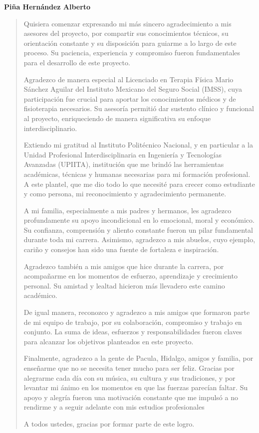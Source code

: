 \noindent \textbf{Piña Hernández Alberto}
\begin{quote}
    Quisiera comenzar expresando mi más sincero agradecimiento a mis asesores del proyecto, por compartir sus conocimientos técnicos, su orientación constante y su disposición para guiarme a lo largo de este proceso. Su paciencia, experiencia y compromiso fueron fundamentales para el desarrollo de este proyecto.
    
    Agradezco de manera especial al Licenciado en Terapia Física Mario Sánchez Aguilar del Instituto Mexicano del Seguro Social (IMSS), cuya participación fue crucial para aportar los conocimientos médicos y de fisioterapia necesarios. Su asesoría permitió dar sustento clínico y funcional al proyecto, enriqueciendo de manera significativa su enfoque interdisciplinario.
    
    Extiendo mi gratitud al Instituto Politécnico Nacional, y en particular a la Unidad Profesional Interdisciplinaria en Ingeniería y Tecnologías Avanzadas (UPIITA), institución que me brindó las herramientas académicas, técnicas y humanas necesarias para mi formación profesional. A este plantel, que me dio todo lo que necesité para crecer como estudiante y como persona, mi reconocimiento y agradecimiento permanente.
    
    A mi familia, especialmente a mis padres y hermanos, les agradezco profundamente su apoyo incondicional en lo emocional, moral y económico. Su confianza, comprensión y aliento constante fueron un pilar fundamental durante toda mi carrera. Asimismo, agradezco a mis abuelos, cuyo ejemplo, cariño y consejos han sido una fuente de fortaleza e inspiración.
    
    Agradezco también a mis amigos que hice durante la carrera, por acompañarme en los momentos de esfuerzo, aprendizaje y crecimiento personal. Su amistad y lealtad hicieron más llevadero este camino académico.
    
    De igual manera, reconozco y agradezco a mis amigos que formaron parte de mi equipo de trabajo, por su colaboración, compromiso y trabajo en conjunto. La suma de ideas, esfuerzos y responsabilidades fueron claves para alcanzar los objetivos planteados en este proyecto.
    
    Finalmente, agradezco a la gente de Pacula, Hidalgo, amigos y familia, por enseñarme que no se necesita tener mucho para ser feliz. Gracias por alegrarme cada día con su música, su cultura y sus tradiciones, y por levantar mi ánimo en los momentos en que las fuerzas parecían faltar. Su apoyo y alegría fueron una motivación constante que me impulsó a no rendirme y a seguir adelante con mis estudios profesionales
    
    A todos ustedes, gracias por formar parte de este logro.

\end{quote}
\vspace{0.5cm}

